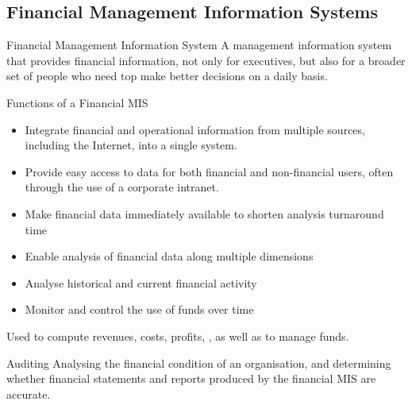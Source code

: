 \documentclass[\main/notes.tex]{subfiles}
\begin{document}
			\subsection{Financial Management Information Systems}
				\begin{definition}{Financial Management Information System}
					A management information system that provides financial information, not only for executives, but also for a broader set of people who need top make better decisions on a daily basis.
				\end{definition}
				\begin{sidenote}{Functions of a Financial MIS}
						\begin{itemize}[nosep]
							\item Integrate financial and operational information from multiple sources, including the Internet, into a single system.
							\item Provide easy access to data for both financial and non-financial users, often through the use of a corporate intranet.
							\item Make financial data immediately available to shorten analysis turnaround time
							\item Enable analysis of financial data along multiple dimensions
							\item Analyse historical and current financial activity
							\item Monitor and control the use of funds over time
						\end{itemize}
					Used to compute revenues, costs, profits, , as well as to manage funds.
					\begin{definition}{Auditing}
						Analysing the financial condition of an organisation, and determining whether financial statements and reports produced by the financial MIS are accurate.
					\end{definition}
				\end{sidenote}
\end{document}
